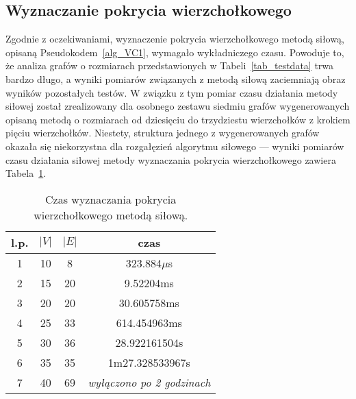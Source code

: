 \subsection{Wyznaczanie pokrycia wierzchołkowego}
\par{
  Zgodnie z oczekiwaniami, wyznaczenie pokrycia wierzchołkowego metodą siłową, opisaną Pseudokodem~\ref{alg_VC1}, wymagało wykładniczego czasu.
  Powoduje to, że analiza grafów o rozmiarach przedstawionych w Tabeli~\ref{tab_testdata} trwa bardzo długo, a wyniki pomiarów związanych z metodą siłową zaciemniają obraz wyników pozostałych testów.
  W związku z tym pomiar czasu działania metody siłowej został zrealizowany dla osobnego zestawu siedmiu grafów wygenerowanych opisaną metodą o rozmiarach od dziesięciu do trzydziestu wierzchołków z krokiem pięciu wierzchołków.
  Niestety, struktura jednego z wygenerowanych grafów okazała się niekorzystna dla rozgałęzień algorytmu siłowego --- wyniki pomiarów czasu działania siłowej metody wyznaczania pokrycia wierzchołkowego zawiera Tabela~\ref{tab_vc_naive}.
  \begin{table}
    \begin{center}
      \begin{tabular}{| c | c | c | c |}
        \hline
        l.p. & $|V|$ & $|E|$ & czas \\ \hline
        1 & 10 & 8 & 323.884$\mu$s \\
        2 & 15 & 20 & 9.52204ms \\
        3 & 20 & 20 & 30.605758ms \\
        4 & 25 & 33 & 614.454963ms \\
        5 & 30 & 36 & 28.922161504s \\
        6 & 35 & 35 & 1m27.328533967s \\
        7 & 40 & 69 & \textit{wyłączono po 2 godzinach} \\ \hline
      \end{tabular} 
    \end{center}
    \caption{Czas wyznaczania pokrycia wierzchołkowego metodą siłową.}
    \label{tab_vc_naive}
  \end{table}
}
